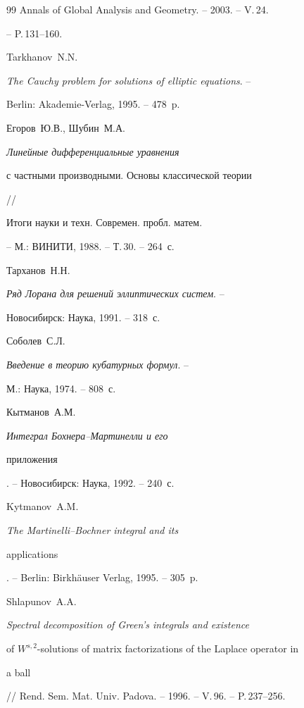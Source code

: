 \begin{thebibliography}{99}
Annals of Global Analysis and Geometry. -- 2003. -- V.\,24.


-- P.\,131--160.





 {Tarkhanov~N.N.}


{\it The Cauchy problem for solutions of elliptic equations}. --


Berlin: Akademie-Verlag, 1995. -- 478~p.





 {Егоров~Ю.В., Шубин~М.А.}


{\it Линейные дифференциальные уравнения


с частными производными. Основы классической теории} //


Итоги науки и техн. Современ. пробл. матем. 


-- М.: ВИНИТИ, 1988. -- Т.\,30. -- 264~с.





 {Тарханов~Н.Н.}


{\it Ряд Лорана для решений эллиптических систем}. --


Новосибирск: Наука, 1991. -- 318~с.





 {Соболев~С.Л.}


{\it Введение в теорию кубатурных формул}. --


М.: Наука, 1974. -- 808~с.







{Кытманов~А.М.} {\it Интеграл Бохнера--Мартинелли и его


приложения}. -- Новосибирск: Наука, 1992. -- 240~с.







{Kytmanov~A.M.} {\it The Martinelli--Bochner integral and its


applications}. -- Berlin: Birkh\"auser Verlag, 1995. -- 305~p.





 {Shlapunov~A.A.}


{\it Spectral decomposition of Green's integrals and existence


of $W^{s,2}$-solutions of matrix factorizations of the Laplace operator in


a ball} // Rend. Sem. Mat. Univ. Padova. -- 1996. -- V.\,96. -- P.\,237--256.








\end{thebibliography}





